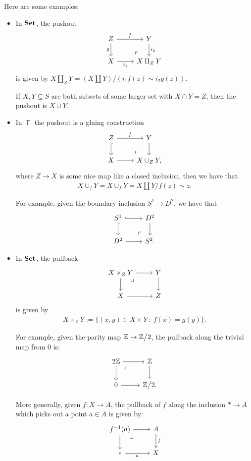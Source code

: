 \documentclass{article}[11pt]
\begin{document}
Here are some examples:
\begin{itemize}\itemsep0em
    \item In $\textbf{Set}$, the pushout
	\[
		\begin{tikzcd}
			Z\dar["g" left]\rar["f" above] & Y\dar["i_2" right] \\
			X\rar["i_1" below] & X\amalg_Z Y \po
		\end{tikzcd}
	\]
	is given by $X\amalg_Z Y = (X\amalg Y)\Big/(i_1 f(z) \sim i_2 g(z))$.

	If $X,Y\subseteq S$ are both subsets of some larger set with $X\cap Y = Z$, then the pushout is $X\cup Y$.
	\item In $\Top$ the pushout is a gluing construction
	\[
		\begin{tikzcd}
		Z\dar[hook]\rar["f"] & Y\dar \\
		X\rar & X\cup_Z Y\po,
		\end{tikzcd}
	\]
	where $Z\to X$ is some nice map like a closed inclusion, then we have that
	\begin{align*}
		X\cup_f Y = X\cup_f Y = X\amalg Y \Big/ f(z) \sim z.
	\end{align*}

	For example, given the boundary inclusion $S^1 \to D^2$, we have that
	\[
		\begin{tikzcd}
		S^1\dar[hook]\rar[hook] & D^2\dar \\
		D^2\rar & S^2. \po
		\end{tikzcd}
	\]

	\item In $\textbf{Set}$, the pullback
	\[
		\begin{tikzcd}
		X\times_Z Y\rar\dar\pb & Y\dar \\
		X\rar & Z
		\end{tikzcd}
	\]
	is given by
	\begin{align*}
		X\times_Z Y := \{(x,y)\in X\times Y \ : \ f(x) = g(y)\}.
	\end{align*}

	For example, given the parity map $\mathbb{Z}\to \mathbb{Z}\big/2$, the pullback along the trivial map from 0 is:
	\[
		\begin{tikzcd}
		2\Z\rar\dar\pb & \Z\dar \\
		0\rar & \Z\big/2.
		\end{tikzcd}
	\]

	More generally, given $f: X\to A$, the pullback of $f$ along the inclusion $\ast \to A$ which picks out a point $a\in A$ is given by:
	\[
		\begin{tikzcd}
		f^{-1}(a) \rar\dar\pb & A\dar["f" right] \\
		\ast\rar["a" below] & X
		\end{tikzcd}
	\]
\end{itemize}
\end{document}
